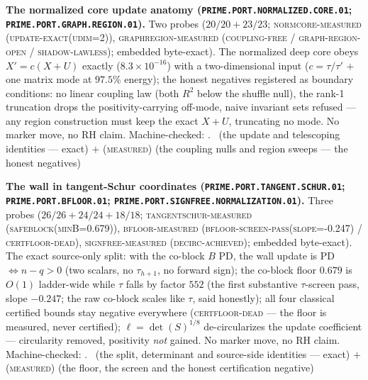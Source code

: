 \documentclass[11pt,a4paper]{article}
\theoremstyle{definition}
\begin{document}
\par\smallskip\noindent\textbf{The normalized core update
anatomy (\texttt{PRIME.PORT.NORMALIZED.\allowbreak CORE.01};
\texttt{PRIME.PORT.GRAPH.\allowbreak REGION.01}).}
Two probes ($20/20 + 23/23$; \textsc{normcore-measured
(update-exact(udim=2))}, \textsc{graphregion-measured
(coupling-free / graph-region-open / shadow-lawless)}; embedded
byte-exact).  The normalized deep core obeys $X' = c(X + U)$
exactly ($8.3\times10^{-16}$) with a two-dimensional input ($c =
\tau/\tau'$ $+$ one matrix mode at $97.5\%$ energy); the honest
negatives registered as boundary conditions: no linear coupling
law (both $R^{2}$ below the shuffle null), the rank-1
truncation drops the positivity-carrying off-mode, naive
invariant sets refused --- any region construction must keep
the exact $X + U$, truncating no mode.  No marker move, no RH
claim.
Machine-checked: .
\mE\ (the update and telescoping identities --- exact) $+$
(\textsc{measured}) (the coupling nulls and region sweeps ---
the honest negatives)
\par\smallskip

\par\smallskip\noindent\textbf{The wall in tangent-Schur
coordinates (\texttt{PRIME.PORT.TANGENT.\allowbreak SCHUR.01};
\texttt{PRIME.PORT.\allowbreak BFLOOR.01};
\texttt{PRIME.PORT.SIGNFREE.\allowbreak NORMALIZATION.01}).}
Three probes ($26/26 + 24/24 + 18/18$;
\textsc{tangentschur-measured (safeblock(minB=0.679))},
\textsc{bfloor-measured (bfloor-screen-pass(slope=-0.247) /
certfloor-dead)}, \textsc{signfree-measured (decirc-achieved)};
embedded byte-exact).  The exact source-only split: with the
co-block $B$ PD, the wall update is PD $\iff n - q > 0$ (two
scalars, no $\tau_{h+1}$, no forward sign); the co-block floor
$0.679$ is $O(1)$ ladder-wide while $\tau$ falls by factor $552$
(the first substantive $\tau$-screen pass, slope $-0.247$; the
raw co-block scales like $\tau$, said honestly); all four
classical certified bounds stay negative everywhere
(\textsc{certfloor-dead} --- the floor is measured, never
certified); $\ell = \det(S)^{1/8}$ de-circularizes the update
coefficient --- circularity removed, positivity \emph{not}
gained.  No marker move, no RH claim.
Machine-checked: .
\mE\ (the split, determinant and source-side identities ---
exact) $+$ (\textsc{measured}) (the floor, the screen and the
honest certification negative)
\par\smallskip
\end{document}
